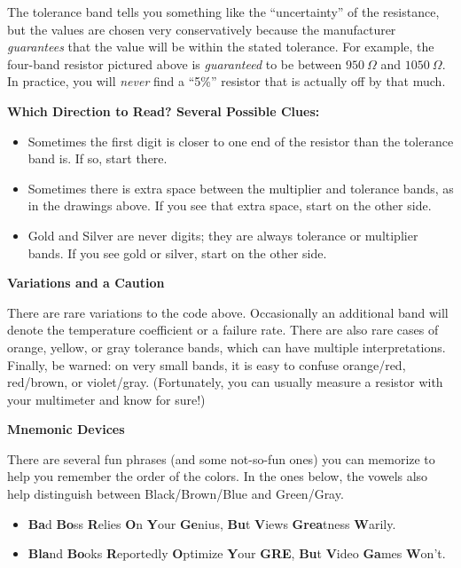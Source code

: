 The tolerance band tells you something like the ``uncertainty'' of the resistance, but the values are chosen very conservatively because the manufacturer \textit{guarantees} that the value will be within the stated tolerance.  For example, the four-band resistor pictured above is \textit{guaranteed} to be between $950~\Omega$ and $1050~\Omega$.  In practice, you will \textit{never} find a ``5\%'' resistor that is actually off by that much.


\medskip
\textbf{Which Direction to Read? Several Possible Clues:}
\begin{itemize}[nosep]
\item Sometimes the first digit is closer to one end of the resistor than the tolerance band is.  If so, start there.
\item Sometimes there is extra space between the multiplier and tolerance bands, as in the drawings above.  If you see that extra space, start on the other side.
\item Gold and Silver are never digits; they are always tolerance or multiplier bands.  If you see gold or silver, start on the other side.
\end{itemize}

\medskip
\textbf{Variations and a Caution}

There are rare variations to the code above.  Occasionally an additional band will denote the temperature coefficient or a failure rate.  There are also rare cases of orange, yellow, or gray tolerance bands, which can have multiple interpretations.  Finally, be warned: on very small bands, it is easy to confuse orange/red, red/brown, or violet/gray.  (Fortunately, you can usually measure a resistor with your multimeter and know for sure!)

\medskip
\textbf{Mnemonic Devices}

There are several fun phrases (and some not-so-fun ones) you can memorize to help you remember the order of the colors.   In the ones below, the vowels also help distinguish between Black/Brown/Blue and Green/Gray.
\begin{itemize}[nosep]
\item \textbf{Ba}d \textbf{Bo}ss \textbf{R}elies \textbf{O}n \textbf{Y}our \textbf{Ge}nius, \textbf{Bu}t \textbf{V}iews \textbf{Grea}tness \textbf{W}arily.
\item \textbf{Bla}nd \textbf{Bo}oks \textbf{R}eportedly \textbf{O}ptimize \textbf{Y}our \textbf{GRE}, \textbf{Bu}t \textbf{V}ideo \textbf{Ga}mes \textbf{W}on't.
\end{itemize}


